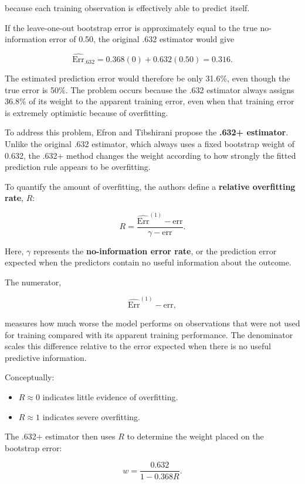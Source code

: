 \documentclass[
  letterpaper,
  DIV=11,
  numbers=noendperiod]{scrreprt}
\providecommand{\tightlist}{%
  \setlength{\itemsep}{0pt}\setlength{\parskip}{0pt}}
\begin{document}
because each training observation is effectively able to predict itself.

If the leave-one-out bootstrap error is approximately equal to the true
no-information error of 0.50, the original .632 estimator would give

\[
\widehat{\mathrm{Err}}_{.632}
=
0.368(0)
+
0.632(0.50)
=
0.316.
\]

The estimated prediction error would therefore be only 31.6\%, even
though the true error is 50\%. The problem occurs because the .632
estimator always assigns 36.8\% of its weight to the apparent training
error, even when that training error is extremely optimistic because of
overfitting.

To address this problem, Efron and Tibshirani propose the \textbf{.632+
estimator}. Unlike the original .632 estimator, which always uses a
fixed bootstrap weight of 0.632, the .632+ method changes the weight
according to how strongly the fitted prediction rule appears to be
overfitting.

To quantify the amount of overfitting, the authors define a
\textbf{relative overfitting rate}, \(R\):

\[
R
=
\frac{
\widehat{\mathrm{Err}}^{(1)}-\mathrm{err}
}{
\gamma-\mathrm{err}
}.
\]

Here, \(\gamma\) represents the \textbf{no-information error rate}, or
the prediction error expected when the predictors contain no useful
information about the outcome.

The numerator,

\[
\widehat{\mathrm{Err}}^{(1)}-\mathrm{err},
\]

measures how much worse the model performs on observations that were not
used for training compared with its apparent training performance. The
denominator scales this difference relative to the error expected when
there is no useful predictive information.

Conceptually:

\begin{itemize}
\tightlist
\item
  \(R \approx 0\) indicates little evidence of overfitting.
\item
  \(R \approx 1\) indicates severe overfitting.
\end{itemize}

The .632+ estimator then uses \(R\) to determine the weight placed on
the bootstrap error:

\[
w
=
\frac{0.632}
{1-0.368R}.
\]
\end{document}
